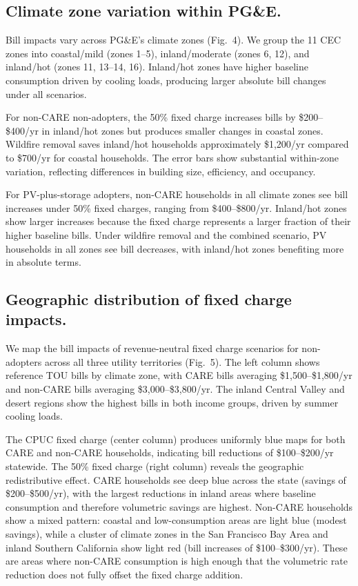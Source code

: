 \documentclass[11pt]{article}
\begin{document}
\subsection*{Climate zone variation within PG\&E.}

Bill impacts vary across PG\&E's climate zones (Fig.~4). We group the 11 CEC zones into coastal/mild (zones 1--5), inland/moderate (zones 6, 12), and inland/hot (zones 11, 13--14, 16). Inland/hot zones have higher baseline consumption driven by cooling loads, producing larger absolute bill changes under all scenarios.

For non-CARE non-adopters, the 50\% fixed charge increases bills by \$200--\$400/yr in inland/hot zones but produces smaller changes in coastal zones. Wildfire removal saves inland/hot households approximately \$1,200/yr compared to \$700/yr for coastal households. The error bars show substantial within-zone variation, reflecting differences in building size, efficiency, and occupancy.

For PV-plus-storage adopters, non-CARE households in all climate zones see bill increases under 50\% fixed charges, ranging from \$400--\$800/yr. Inland/hot zones show larger increases because the fixed charge represents a larger fraction of their higher baseline bills. Under wildfire removal and the combined scenario, PV households in all zones see bill decreases, with inland/hot zones benefiting more in absolute terms.

\subsection*{Geographic distribution of fixed charge impacts.}

We map the bill impacts of revenue-neutral fixed charge scenarios for non-adopters across all three utility territories (Fig.~5). The left column shows reference TOU bills by climate zone, with CARE bills averaging \$1,500--\$1,800/yr and non-CARE bills averaging \$3,000--\$3,800/yr. The inland Central Valley and desert regions show the highest bills in both income groups, driven by summer cooling loads.

The CPUC fixed charge (center column) produces uniformly blue maps for both CARE and non-CARE households, indicating bill reductions of \$100--\$200/yr statewide. The 50\% fixed charge (right column) reveals the geographic redistributive effect. CARE households see deep blue across the state (savings of \$200--\$500/yr), with the largest reductions in inland areas where baseline consumption and therefore volumetric savings are highest. Non-CARE households show a mixed pattern: coastal and low-consumption areas are light blue (modest savings), while a cluster of climate zones in the San Francisco Bay Area and inland Southern California show light red (bill increases of \$100--\$300/yr). These are areas where non-CARE consumption is high enough that the volumetric rate reduction does not fully offset the fixed charge addition.
\end{document}
